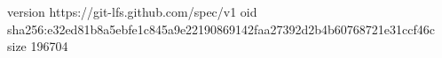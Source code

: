 version https://git-lfs.github.com/spec/v1
oid sha256:e32ed81b8a5ebfe1c845a9e22190869142faa27392d2b4b60768721e31ccf46c
size 196704

